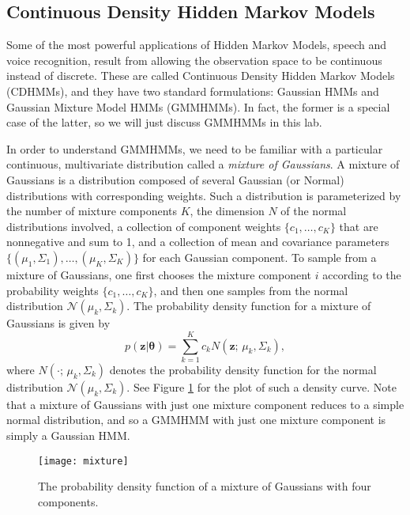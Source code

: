 
\subsection{Continuous Density Hidden Markov Models}
Some of the most powerful applications of Hidden Markov Models, speech and voice recognition, result from allowing the observation space to be continuous instead of discrete.
These are called Continuous Density Hidden Markov Models (CDHMMs), and they have two standard formulations: Gaussian HMMs and Gaussian Mixture Model HMMs (GMMHMMs).
In fact, the former is a special case of the latter, so we will just discuss GMMHMMs in this lab.

In order to understand GMMHMMs, we need to be familiar with a particular continuous, multivariate distribution called a \emph{mixture of Gaussians}.
A mixture of Gaussians is a distribution composed of several Gaussian (or Normal) distributions with corresponding weights.
Such a distribution is parameterized by the number of mixture components $K$, the dimension $N$ of the normal distributions involved, a collection of component weights
$\{c_1, \ldots, c_K\}$ that are nonnegative and sum to 1, and a collection of mean and covariance parameters $\{(\mu_1,\Sigma_1), \ldots, (\mu_K,\Sigma_K)\}$ for each Gaussian
component. To sample from a mixture of Gaussians, one first chooses the mixture component $i$ according to the probability weights $\{c_1,\ldots,c_K\}$, and then one
samples from the normal distribution $\mathcal{N}(\mu_k, \Sigma_k)$. The probability density function for a mixture of Gaussians is given by
\[
p(\mathbf{z}|\mathbf{\theta}) = \sum_{k=1}^K c_kN(\mathbf{z};\,\mu_k,\Sigma_k),
\]
where $N(\cdot;\,\mu_k,\Sigma_k)$ denotes the probability density function for the normal distribution $\mathcal{N}(\mu_k, \Sigma_k)$.
See Figure \ref{fig:mixture} for the plot of such a density curve.
Note that a mixture of Gaussians with just one mixture component reduces to a simple normal distribution, and so a GMMHMM with just one mixture component
is simply a Gaussian HMM.

\begin{figure}
\centering
\texttt{[image: mixture]}
\caption{The probability density function of a mixture of Gaussians with four components.}
\label{fig:mixture}
\end{figure}


